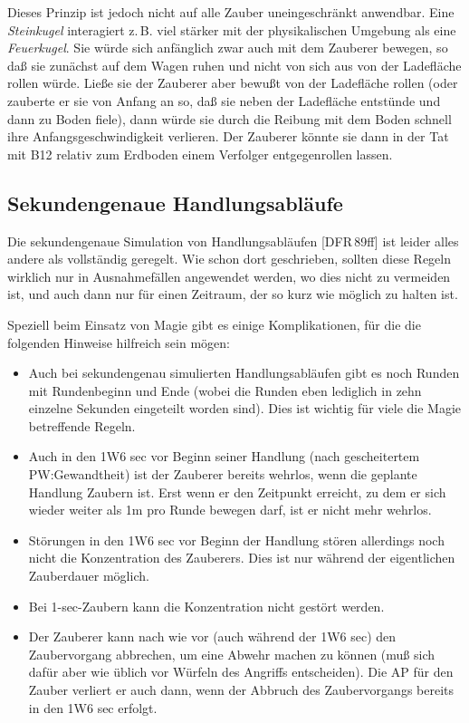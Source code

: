 \documentclass[10pt,a4paper,germanpar]{article}
\begin{document}
Dieses Prinzip ist jedoch nicht auf alle Zauber uneingeschränkt
anwendbar. Eine \emph{Steinkugel} interagiert z.\,B. viel stärker mit
der physikalischen Umgebung als eine \emph{Feuerkugel}. Sie würde
sich anfänglich zwar auch mit dem Zauberer bewegen, so daß sie
zunächst auf dem Wagen ruhen und nicht von sich aus von der
Ladefläche rollen würde. Ließe sie der Zauberer aber bewußt von der
Ladefläche rollen (oder zauberte er sie von Anfang an so, daß sie
neben der Ladefläche entstünde und dann zu Boden fiele), dann würde
sie durch die Reibung mit dem Boden schnell ihre
Anfangsgeschwindigkeit verlieren. Der Zauberer könnte sie dann in der
Tat mit B12 relativ zum Erdboden einem Verfolger entgegenrollen
lassen.


\subsection{Sekundengenaue Handlungsabläufe}

Die sekundengenaue Simulation von Handlungsabläufen [DFR\,89ff] ist
leider alles andere als vollständig geregelt. Wie schon dort
geschrieben, sollten diese Regeln wirklich nur in Ausnahmefällen
angewendet werden, wo dies nicht zu vermeiden ist, und auch dann nur
für einen Zeitraum, der so kurz wie möglich zu halten ist.

Speziell beim Einsatz von Magie gibt es einige Komplikationen, für die
die folgenden Hinweise hilfreich sein mögen:

\begin{itemize}
\item Auch bei sekundengenau simulierten Handlungsabläufen gibt es
  noch Runden mit Rundenbeginn und Ende (wobei die Runden eben
  lediglich in zehn einzelne Sekunden eingeteilt worden sind). Dies
  ist wichtig für viele die Magie betreffende Regeln.
\item Auch in den 1W6 sec vor Beginn seiner Handlung (nach gescheitertem
  PW:Gewandtheit) ist der Zauberer bereits wehrlos, wenn die geplante Handlung
  Zaubern ist. Erst wenn er den Zeitpunkt erreicht, zu dem er sich
  wieder weiter als 1m pro Runde bewegen darf, ist er nicht mehr wehrlos.
\item Störungen in den 1W6 sec vor Beginn der Handlung stören
  allerdings noch nicht die Konzentration des Zauberers. Dies ist nur
  während der eigentlichen Zauberdauer möglich.
\item Bei 1-sec-Zaubern kann die Konzentration nicht gestört werden.
\item Der Zauberer kann nach wie vor (auch während der 1W6 sec) den
  Zaubervorgang abbrechen, um eine Abwehr machen zu können (muß sich dafür
  aber wie üblich vor Würfeln des Angriffs entscheiden). Die AP für den Zauber
  verliert er auch dann, wenn der Abbruch des Zaubervorgangs bereits in den 1W6
  sec erfolgt. 
\end{itemize}
\end{document}
